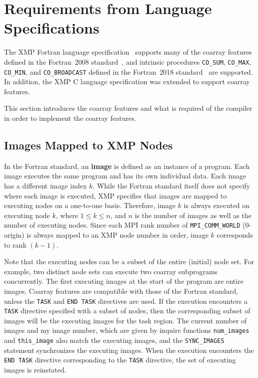 \section{Requirements from Language Specifications}\label{sec:spec}

The XMP Fortran language specification~\cite{xmp} supports many of 
the coarray features defined in the Fortran~2008 standard~\cite{coarray}, 
and intrinsic procedures {\tt CO\_SUM}, {\tt CO\_MAX}, {\tt CO\_MIN}, and 
{\tt CO\_BROADCAST} defined in the Fortran~2018 standard~\cite{coarray18} are supported.
In addition, the XMP C language specification was extended to support coarray features.

This section introduces the coarray features and what is required
of the compiler in order to implement the coarray features.


\subsection{Images Mapped to XMP Nodes}\label{sec:spec-image}

In the Fortran standard, an {\bf image} is defined as an instance of a program. 
Each image executes the same program and has its own individual data.
Each image has a different image index $k$.
While the Fortran standard itself does not specify where each image is executed, 
XMP specifies that images are mapped to executing nodes on a one-to-one basis.
Therefore, image $k$ is always executed on executing node $k$, where $1 \leq k \leq n$, and 
$n$ is the number of images as well as the number of executing nodes. 
Since each MPI rank number of {\tt MPI\_COMM\_WORLD} (0-origin) is 
always mapped to an XMP node number in order, image $k$ corresponds to 
rank $(k - 1)$.

Note that the executing nodes can be a subset of the entire (initial) node set. 
For example, two distinct node sets can execute two coarray subprograms concurrently.
The first executing images at the start of the program are entire images.
Coarray features are compatible with those of the Fortran standard, unless 
the {\tt TASK} and {\tt END TASK} directives are used.
If the execution encounters a {\tt TASK} directive specified with a subset of nodes, 
then the corresponding subset of images will be the executing images for the task region. 
The current number of images and my image number, which are given by inquire functions
{\tt num\_images} and {\tt this\_image} also match the executing images, and
the {\tt SYNC\_IMAGES} statement synchronizes the executing images.
When the execution encounters the {\tt END TASK} directive corresponding to the
{\tt TASK} directive, the set of executing images is reinstated.

